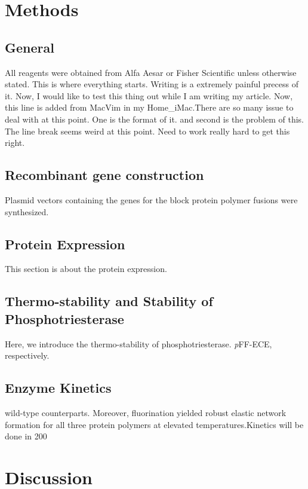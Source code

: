 \begin{refsection}
\section{Methods}

\subsection{General}

All reagents were obtained from Alfa Aesar or Fisher
Scientific unless otherwise stated. This is where everything starts. Writing is
a extremely painful precess of it. Now, I would like to test this thing out
while I am writing my article. Now, this line is added from MacVim in my
Home\_iMac.There are so many issue to deal with at this point. One is the
format of it. and second is the problem of this. The line break seems weird at
this point. Need to work really hard to get this right.

\subsection{Recombinant gene construction}

Plasmid vectors containing the genes for the block protein polymer fusions were
synthesized.

\subsection{Protein Expression}

This section is about the protein expression.

\subsection{Thermo-stability and Stability of Phosphotriesterase}
\label{sec:thermo}

Here, we introduce the thermo-stability of phosphotriesterase.
\emph{p}FF-ECE, respectively. 

\subsection{Enzyme Kinetics}

wild-type counterparts. Moreover, fluorination yielded robust elastic network
formation for all three protein polymers at elevated temperatures.Kinetics will be done in 200

\section{Discussion}


\end{refsection}
